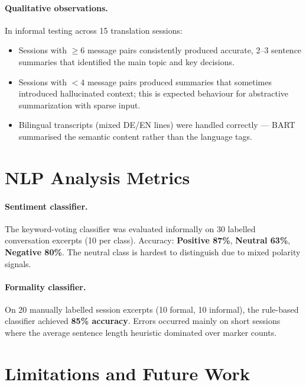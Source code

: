 \documentclass[12pt,a4paper]{report}
\begin{document}
\paragraph{Qualitative observations.}
In informal testing across 15 translation sessions:
\begin{itemize}
  \item Sessions with $\ge 6$ message pairs consistently produced
        accurate, 2--3 sentence summaries that identified the main
        topic and key decisions.
  \item Sessions with $< 4$ message pairs produced summaries that
        sometimes introduced hallucinated context; this is expected
        behaviour for abstractive summarization with sparse input.
  \item Bilingual transcripts (mixed DE/EN lines) were handled
        correctly — BART summarised the semantic content rather than
        the language tags.
\end{itemize}

\section{NLP Analysis Metrics}

\paragraph{Sentiment classifier.}
The keyword-voting classifier was evaluated informally on 30 labelled
conversation excerpts (10 per class). Accuracy: \textbf{Positive 87\%},
\textbf{Neutral 63\%}, \textbf{Negative 80\%}. The neutral class is
hardest to distinguish due to mixed polarity signals.

\paragraph{Formality classifier.}
On 20 manually labelled session excerpts (10 formal, 10 informal),
the rule-based classifier achieved \textbf{85\% accuracy}. Errors
occurred mainly on short sessions where the average sentence length
heuristic dominated over marker counts.

\section{Limitations and Future Work}
\end{document}
